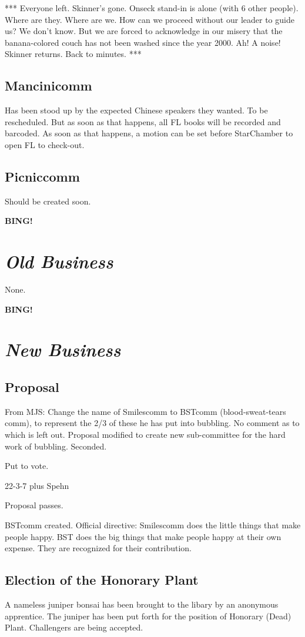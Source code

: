 \documentclass[10pt]{article}
\newcommand{\bing}{{\bf BING!} }
\newcommand{\goto}[1]{\bing \vskip 12pt \section*{{\em{#1}}}}
\newcommand{\ps}{ plus Spehn\xspace}
\begin{document}
***
Everyone left.
Skinner's gone.
Onseck stand-in  is alone (with 6 other people).
Where are they.
Where are we.
How can we proceed without our leader to guide us?
We don't know. But we are forced to acknowledge in our misery that the banana-colored couch has not been washed since the year 2000.
Ah! A noise!
Skinner returns.
Back to minutes.
***

\subsection{Mancinicomm} 
Has been stood up by the expected Chinese speakers they wanted. To be rescheduled. But as soon as that happens, all FL books will be recorded and barcoded. As soon as that happens, a motion can be set before StarChamber to open FL to check-out.

\subsection{Picniccomm}
Should be created soon.

\goto{Old Business}

None.

\goto{New Business}

\subsection{Proposal} 
From MJS:
Change the name of Smilescomm to BSTcomm (blood-sweat-tears comm), to represent the 2/3 of these he has put into bubbling. No comment as to which is left out.
Proposal modified to create new sub-committee for the hard work of bubbling.
Seconded.

Put to vote.

22-3-7\ps

Proposal passes.

BSTcomm created. Official directive: Smilescomm does the little things that make people happy. BST does the big things that make people happy at their own expense. They are recognized for their contribution.

\subsection{Election of the Honorary Plant}
A nameless juniper bonsai has been brought to the libary by an anonymous apprentice. The juniper has been put forth for the position of Honorary (Dead) Plant. Challengers are being accepted.
\end{document}
